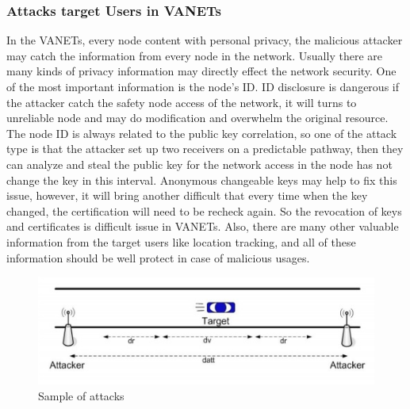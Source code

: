 \documentclass[conference]{IEEEtran}
\begin{document}
\subsubsection{Attacks target Users in VANETs}
In the VANETs, every node content with personal privacy, the malicious attacker may catch the information from every node in the network. Usually there are many kinds of privacy information may directly effect the network security. One of the most important information is the node's ID. ID disclosure is dangerous if the attacker catch the safety node access of the network, it will turns to unreliable node and may do modification and overwhelm the original resource. The node ID is always related to the public key correlation, so one of the attack type is that the attacker set up two receivers on a predictable pathway, then they can analyze and steal the public key for the network access in the node has not change the key in this interval. Anonymous changeable keys may help to fix this issue, however, it will bring another difficult that every time when the key changed, the certification will need to be  recheck again. So the revocation of keys and certificates is difficult issue in VANETs. Also, there are many other valuable information from the target users like location tracking, and all of these information should be well protect in case of malicious usages. 
\begin{figure}[h]
  \includegraphics[width=\linewidth]{Attack2.jpg}
  \caption{Sample of attacks}
  \label{fig:Attack2}
\end{figure}
\end{document}
